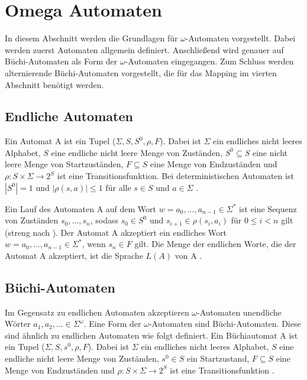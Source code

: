 \section{Omega Automaten}

In diesem Abschnitt werden die Grundlagen für $\omega$-Automaten vorgestellt. Dabei werden zuerst Automaten allgemein definiert. Anschließend wird genauer auf Büchi-Automaten als Form der $\omega$-Automaten eingegangen. Zum Schluss werden alternierende Büchi-Automaten vorgestellt, die für das Mapping im vierten Abschnitt benötigt werden. 

\subsection{Endliche Automaten}
Ein Automat A ist ein Tupel ($\Sigma, S, S^0, \rho, F$). Dabei ist $\Sigma$ ein endliches nicht leeres Alphabet, $S$ eine endliche nicht leere Menge von Zuständen, $S^0\subseteq S$ eine nicht leere Menge von Startzuständen, $F\subseteq S$ eine Menge von Endzuständen und $\rho : S \times \Sigma \rightarrow 2^S$ ist eine Transitionsfunktion. Bei deterministischen Automaten ist $|S^0|=1$ und $|\rho(s,a)|\leq 1$ für alle $s\in S$ und $a \in \Sigma$ \cite{vardi+96}.

Ein Lauf des Automaten A auf dem Wort $w=a_0,...,a_{n-1}\in \Sigma^\ast$ ist eine Sequenz von Zuständen $s_0,...,s_n$, sodass $s_0 \in S^0$ und $s_{i+1} \in \rho(s_i, a_i)$ für $0\leq i<n$ gilt (streng nach \cite{vardi+96}). Der Automat A akzeptiert ein endliches Wort $w=a_0,...,a_{n-1}\in\Sigma^\ast$, wenn $s_n\in F$ gilt. Die Menge der endlichen Worte, die der Automat A akzeptiert, ist die Sprache $L(A)$ von A \cite{vardi+96}. 

\subsection{Büchi-Automaten}
Im Gegensatz zu endlichen Automaten akzeptieren $\omega$-Automaten unendliche Wörter $a_1,a_2,...\in\Sigma^{\omega}$. Eine Form der $\omega$-Automaten sind Büchi-Automaten. Diese sind ähnlich zu endlichen Automaten wie folgt definiert. Ein Büchiautomat A ist ein Tupel ($\Sigma, S, s^0, \rho, F$). Dabei ist $\Sigma$ ein endliches nicht leeres Alphabet, $S$ eine endliche nicht leere Menge von Zuständen, $s^0\in S$ ein Startzustand, $F\subseteq S$ eine Menge von Endzuständen und $\rho : S \times \Sigma \rightarrow 2^S$ ist eine Transitionsfunktion \cite{hofmann11,vardi+96}.

